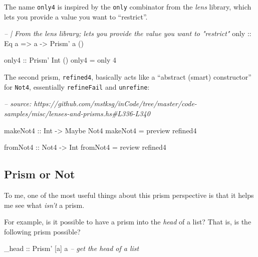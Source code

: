 \documentclass[]{article}
\newenvironment{Shaded}{}{}
\newcommand{\CommentTok}[1]{\textcolor[rgb]{0.38,0.63,0.69}{\textit{#1}}}
\newcommand{\DataTypeTok}[1]{\textcolor[rgb]{0.56,0.13,0.00}{#1}}
\newcommand{\DecValTok}[1]{\textcolor[rgb]{0.25,0.63,0.44}{#1}}
\newcommand{\FunctionTok}[1]{\textcolor[rgb]{0.02,0.16,0.49}{#1}}
\newcommand{\NormalTok}[1]{#1}
\newcommand{\OtherTok}[1]{\textcolor[rgb]{0.00,0.44,0.13}{#1}}
\begin{document}
The name \texttt{only4} is inspired by the \texttt{only} combinator from the
\emph{lens} library, which lets you provide a value you want to ``restrict''.

\begin{Shaded}
\begin{Highlighting}[]
\CommentTok{-- | From the lens library; lets you provide the value you want to "restrict"}
\OtherTok{only ::} \DataTypeTok{Eq}\NormalTok{ a }\OtherTok{=>}\NormalTok{ a }\OtherTok{->} \DataTypeTok{Prism'}\NormalTok{ a ()}

\OtherTok{only4 ::} \DataTypeTok{Prism'} \DataTypeTok{Int}\NormalTok{ ()}
\NormalTok{only4 }\FunctionTok{=}\NormalTok{ only }\DecValTok{4}
\end{Highlighting}
\end{Shaded}

The second prism, \texttt{refined4}, basically acts like a ``abstract (smart)
constructor'' for \texttt{Not4}, essentially \texttt{refineFail} and
\texttt{unrefine}:

\begin{Shaded}
\begin{Highlighting}[]
\CommentTok{-- source: https://github.com/mstksg/inCode/tree/master/code-samples/misc/lenses-and-prisms.hs#L336-L340}

\OtherTok{makeNot4 ::} \DataTypeTok{Int} \OtherTok{->} \DataTypeTok{Maybe} \DataTypeTok{Not4}
\NormalTok{makeNot4 }\FunctionTok{=}\NormalTok{ preview refined4}

\OtherTok{fromNot4 ::} \DataTypeTok{Not4} \OtherTok{->} \DataTypeTok{Int}
\NormalTok{fromNot4 }\FunctionTok{=}\NormalTok{ review refined4}
\end{Highlighting}
\end{Shaded}

\hypertarget{prism-or-not}{%
\subsection{Prism or Not}\label{prism-or-not}}

To me, one of the most useful things about this prism perspective is that it
helps me see what \emph{isn't} a prism.

For example, is it possible to have a prism into the \emph{head} of a list? That
is, is the following prism possible?

\begin{Shaded}
\begin{Highlighting}[]
\OtherTok{_head ::} \DataTypeTok{Prism'}\NormalTok{ [a] a           }\CommentTok{-- get the head of a list}
\end{Highlighting}
\end{Shaded}
\end{document}
